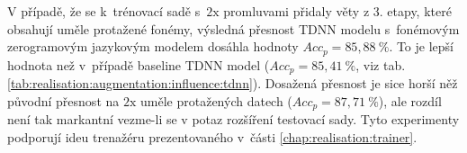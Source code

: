 
V případě, že se k~trénovací sadě s~$2\mathrm{x}$ promluvami přidaly věty z 3. etapy, které obsahují uměle protažené fonémy, výsledná přesnost TDNN modelu s~fonémovým zerogramovým jazykovým modelem dosáhla hodnoty $Acc_{p} = 85,88~\%$.
To je lepší hodnota než v~případě baseline TDNN model ($Acc_{p} = 85,41~\%$, viz tab. \ref{tab:realisation:augmentation:influence:tdnn}).
Dosažená přesnost je sice horší něž původní přesnost na $2\mathrm{x}$ uměle protažených datech ($Acc_{p} = 87,71~\%$), ale rozdíl není tak markantní vezme-li se v potaz rozšíření testovací sady.
Tyto experimenty podporují ideu trenažéru prezentovaného v~části \ref{chap:realisation:trainer}.
